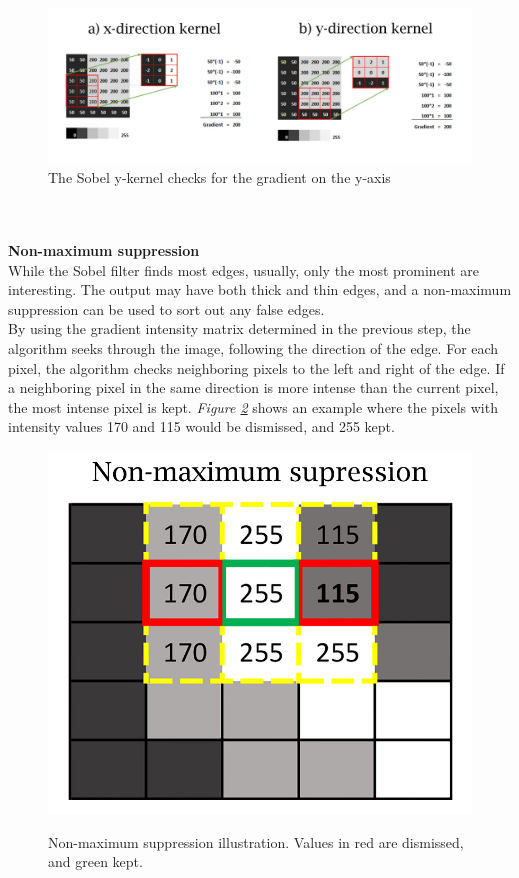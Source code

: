 \begin{figure}[H]
        \centering
        \includegraphics[width=1\linewidth]{figures/PDF/Sobel_kernel.pdf}
        \caption{The Sobel y-kernel checks for the gradient on the y-axis}
        \label{fig:sobel kernel}
\end{figure} \\\\

\noindent \textbf{Non-maximum suppression}\\
\noindent While the Sobel filter finds most edges, usually, only the most prominent are interesting. The output may have both thick and thin edges, and a non-maximum suppression can be used to sort out any false edges. \\

\noindent By using the gradient intensity matrix determined in the previous step, the algorithm seeks through the image, following the direction of the edge. For each pixel, the algorithm checks neighboring pixels to the left and right of the edge. If a neighboring pixel in the same direction is more intense than the current pixel, the most intense pixel is kept. \textit{Figure \ref{fig:canny suppression}} shows an example where the pixels with intensity values 170 and 115 would be dismissed, and 255 kept.\\

\begin{figure}[H]
    \centering
     \includegraphics[width=.37\linewidth]{figures/PDF/Suppresion.pdf}\\
    \caption{Non-maximum suppression illustration. Values in red are dismissed, and green kept.}
    \label{fig:canny suppression}
\end{figure}

